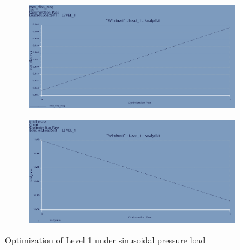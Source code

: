 \documentclass[12pt,letterpaper]{report}
\begin{document}
		\begin{figure}[H]
			\centering
			\begin{subfigure}{.45\textwidth}
				\includegraphics[width=\textwidth]{SinusoidalL1OptimDisp}
				\label{fig:L1SinusoidalOptimDispGraph}
			\end{subfigure}
			\begin{subfigure}{.45\textwidth}
				\includegraphics[width=\textwidth]{SinusoidalL1OptimMass}
				\label{fig:L1SinusoidalOptimMassGraph}
			\end{subfigure}
			\caption{Optimization of Level 1 under sinusoidal pressure load}
		\end{figure}
		
\end{document}
